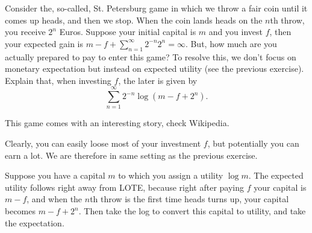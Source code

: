 \documentclass[lectures]{subfiles}
\begin{document}
\begin{exercise}
Consider the, so-called, St.
Petersburg game in which we throw a fair coin until it comes up heads, and then we stop.
When the coin lands heads on the $n$th throw, you receive $2^{n}$ Euros.
Suppose your initial capital is $m$ and you invest $f$, then your expected gain is $m-f + \sum_{n=1}^{\infty} 2^{-n} 2^{n} = \infty$.
But, how much are you actually prepared to pay to enter this game?
To resolve this, we don't focus on monetary expectation but instead on expected utility (see the previous exercise).
Explain that, when investing $f$, the later is given by
\begin{equation}
  \label{eq:135}
  \sum_{n=1}^{\infty} 2^{-n}\log(m - f + 2^{n}).
\end{equation}
\begin{solution}
This game comes with an interesting story,  check Wikipedia.

Clearly, you can easily loose most of your investment $f$, but potentially you can earn a lot. We are therefore in same setting as the previous exercise.

Suppose you have a capital $m$ to which you assign a utility $\log m$.
The expected utility follows right away from LOTE,
because right after paying $f$ your capital is $m-f$, and when the $n$th throw is the first time heads turns up, your capital becomes $m-f+2^{n}$.
Then take the log to convert this capital to utility, and take the expectation.
\end{solution}
\end{exercise}
\end{document}

